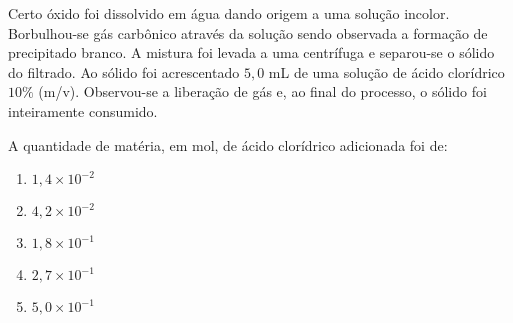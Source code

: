 Certo óxido foi dissolvido em água dando origem a uma solução incolor. Borbulhou-se gás carbônico através da solução sendo observada a formação de precipitado branco.
A mistura foi levada a uma centrífuga e separou-se o sólido do filtrado.
Ao sólido foi acrescentado $5,0$ mL de uma solução de ácido clorídrico $10\%$ (m/v).
Observou-se a liberação de gás e, ao final do processo, o sólido foi inteiramente consumido.

A quantidade de matéria, em mol, de ácido clorídrico adicionada foi de:

\begin{enumerate}[label = (\alph*), itemjoin={\qquad}]
	\item $1,4 \times 10^{-2}$
	\item $4,2 \times 10^{-2}$
	\item $1,8 \times 10^{-1}$
	\item $2,7 \times 10^{-1}$
	\item $5,0 \times 10^{-1}$ 
\end{enumerate}
